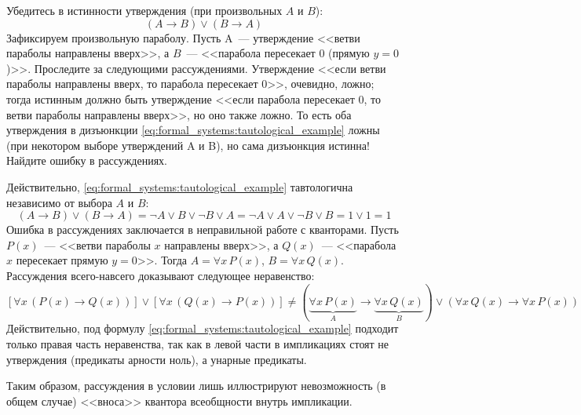\begin{Exercise}[counter=SecExercise]
    \noindent
    Убедитесь в истинности утверждения (при произвольных $ A $ и $ B $):
    \begin{equation}
        \label{eq:formal_systems:tautological_example}
        (A \rightarrow B) \vee (B \rightarrow A)
    \end{equation}
    Зафиксируем произвольную параболу.
    Пусть A~--- утверждение <<ветви параболы направлены вверх>>,
    а $ B $~--- <<парабола пересекает $ 0 $ (прямую $ y = 0 $)>>.
    Проследите за следующими рассуждениями.
    Утверждение <<если ветви параболы направлены вверх, то парабола пересекает 0>>, очевидно, ложно;
    тогда истинным должно быть утверждение <<если парабола пересекает $ 0 $, то ветви параболы направлены вверх>>, но оно также ложно.
    То есть оба утверждения в дизъюнкции \eqref{eq:formal_systems:tautological_example} ложны
    (при некотором выборе утверждений A и B), но сама дизъюнкция истинна!
    Найдите ошибку в рассуждениях.
\end{Exercise}

\begin{Answer}
    \noindent
    Действительно, \eqref{eq:formal_systems:tautological_example} тавтологична независимо от выбора $ A $ и $ B $:
    \[
        (A \rightarrow B) \vee (B \rightarrow A) = \neg A \vee B \vee \neg B \vee A = \neg A \vee A \vee \neg B \vee B = 1 \vee 1 = 1
    \]
    Ошибка в рассуждениях заключается в неправильной работе с кванторами.
    Пусть $ P(x) $~--- <<ветви параболы $ x $ направлены вверх>>,
    а $ Q(x) $~--- <<парабола $ x $ пересекает прямую $ y = 0 $>>.
    Тогда $ A = \forall x \, P(x) $, $ B = \forall x \, Q(x) $.
    Рассуждения всего-навсего доказывают следующее неравенство:
    \[
        \left[ \forall x \, (P(x) \rightarrow Q(x)) \right] \vee \left[ \forall x \, (Q(x) \rightarrow P(x)) \right] \neq
        (\underbrace{\forall x \, P(x)}_{A} \rightarrow \underbrace{\forall x \, Q(x)}_{B}) \vee (\forall x \, Q(x) \rightarrow \forall x \, P(x))
    \]
    Действительно, под формулу \eqref{eq:formal_systems:tautological_example} подходит только правая часть неравенства,
    так как в левой части в импликациях стоят не утверждения (предикаты арности ноль), а унарные предикаты.

    Таким образом, рассуждения в условии лишь иллюстрируют невозможность (в общем случае) <<вноса>> квантора всеобщности внутрь импликации.
\end{Answer}

